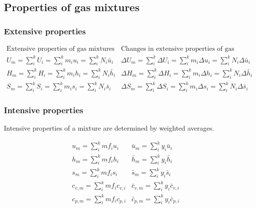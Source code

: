 \documentclass[11pt]{article}
\begin{document}
\subsection{Properties of gas mixtures}
\label{sec:orgf74fe97}

\subsubsection{Extensive properties}
\label{sec:orge48b5bc}
\begin{displaymath}
\begin{array}{c|c}
\text{Extensive properties of gas mixtures} & \text{Changes in extensive properties of gas mixtures} \\
\hline
U_m = \sum_i^k U_i = \sum_i^k m_i u_i = \sum_i^k N_i \bar{u}_i &
\Delta U_m = \sum_i^k \Delta U_i = \sum_i^k m_i \Delta u_i = \sum_i^k N_i \Delta \bar{u}_i \\
H_m = \sum_i^k H_i = \sum_i^k m_i h_i = \sum_i^k N_i \bar{h}_i &
\Delta H_m = \sum_i^k \Delta H_i = \sum_i^k m_i \Delta h_i = \sum_i^k N_i \Delta \bar{h}_i \\
S_m = \sum_i^k S_i = \sum_i^k m_i s_i = \sum_i^k N_i \bar{s}_i &
\Delta S_m = \sum_i^k \Delta S_i = \sum_i^k m_i \Delta s_i = \sum_i^k N_i \Delta \bar{s}_i
\end{array}
\end{displaymath}
\subsubsection{Intensive properties}
\label{sec:org6c8bb1d}
Intensive properties of a mixture are determined by weighted averages.

\begin{displaymath}
\begin{array}{c|c}
u_m = \sum_i^k mf_i u_i & \bar{u}_m = \sum_i^k y_i \bar{u}_i \\
h_m = \sum_i^k mf_i h_i & \bar{h}_m = \sum_i^k y_i \bar{h}_i \\
s_m = \sum_i^k mf_i s_i & \bar{s}_m = \sum_i^k y_i \bar{s}_i \\
c_{v,m} = \sum_i^k mf_i c_{v,i} & \bar{c}_{v,m} = \sum_i^k y_i \bar{c}_{v,i} \\
c_{p,m} = \sum_i^k mf_i c_{p,i} & \bar{c}_{p,m} = \sum_i^k y_i \bar{c}_{p,i} \\
\end{array}
\end{displaymath}
\end{document}
